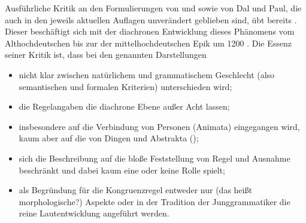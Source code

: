 Ausführliche Kritik an den Formulierungen von \citet{grimm1890,grimm1898} und
\citet{behaghel1928} sowie von Dal\nocite{dal2014} und Paul\nocite{paul2007},
die auch in den jeweils aktuellen Auflagen
\autocite{dal2014,paul2007} unverändert geblieben sind, übt bereits
\citet[11--15, 195--213]{askedal1973}. Dieser beschäftigt sich mit der
diachronen Entwicklung dieses Phänomens vom
Althochdeutschen bis zur  der
mittelhochdeutschen Epik um 1200
\autocites[vgl.][317]{schneidermohr2001}[dazu auch][3--29]{johnson1999}. Die
Essenz seiner Kritik ist, dass bei den genannten Darstellungen

\begin{itemize}
	\item nicht klar zwischen natürlichem und grammatischem Geschlecht (also
		semantischen und formalen Kriterien) unterschieden wird;
	\item die Regelangaben die diachrone Ebene außer Acht
		lassen;
	\item insbesondere auf die Verbindung von Personen (Animata)
		eingegangen wird, kaum aber auf die von Dingen und Abstrakta
		();
	\item sich die Beschreibung auf die bloße Feststellung von Regel und
		Ausnahme beschränkt und dabei  kaum eine
		oder keine Rolle spielt;
	\item als Begründung für die Kongruenzregel entweder nur  (das
		heißt morphologische?) Aspekte oder in der Tradition der
		Junggrammatiker die reine Lautentwicklung angeführt
		werden.
\end{itemize}

